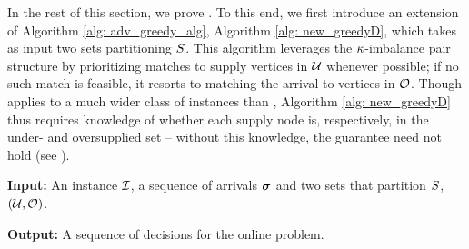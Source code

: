 
In the rest of this section, we prove . To this end, we first introduce an extension of Algorithm \ref{alg: adv_greedy_alg}, Algorithm \ref{alg: new_greedyD}, which takes as input two sets partitioning  $S$. This algorithm leverages the $\kappa$-imbalance pair structure by prioritizing matches to supply vertices in $\mathcal U$ whenever possible; if no such match is feasible, it resorts to matching the arrival to vertices in $\mathcal O$. Though  applies to a much wider class of instances than ,
Algorithm \ref{alg: new_greedyD} thus requires knowledge of whether each supply node is, respectively, in the under- and oversupplied set -- without this knowledge, the guarantee need not hold (see {}).


\begin{algorithm}[h]
\caption{$\altgreedy$}
\label{alg: new_greedyD}
\textbf{Input:} An instance $\mathcal I$, a sequence of arrivals $\bm{\sigma}$ and two sets that partition $S$, $(\mathcal U, \mathcal O)$. 

\textbf{Output:} A sequence of decisions for the online problem.


\end{algorithm}

